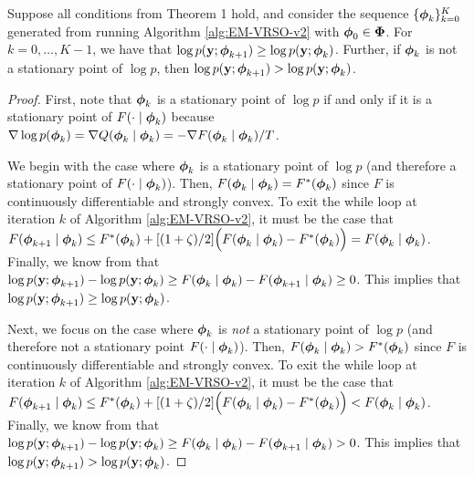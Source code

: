 \begin{lemma}
    Suppose all conditions from Theorem 1 hold, and consider the sequence $\{\boldsymbol{\phi}_k\}_{k=0}^{K}$ generated from running Algorithm \ref{alg:EM-VRSO-v2} with $\boldsymbol{\phi}_0 \in \boldsymbol{\Phi}$. For $k = 0,\ldots,K-1$, we have that $\log p(\mathbf{y};\boldsymbol{\phi}_{k+1}) \geq \log p(\mathbf{y};\boldsymbol{\phi}_k)$. Further, if $\boldsymbol{\phi}_k$ is not a stationary point of $\log p$, then $\log p(\mathbf{y};\boldsymbol{\phi}_{k+1}) > \log p(\mathbf{y};\boldsymbol{\phi}_k)$.
\end{lemma}

\begin{proof}

First, note that $\boldsymbol{\phi}_k$ is a stationary point of $\log p$ if and only if it is a stationary point of $F(\cdot \mid \boldsymbol{\phi}_k)$ because $\nabla \log p(\boldsymbol{\phi}_k) = \nabla Q(\boldsymbol{\phi}_k \mid \boldsymbol{\phi}_k) = -\nabla F(\boldsymbol{\phi}_k \mid \boldsymbol{\phi}_k) / T$.

We begin with the case where $\boldsymbol{\phi}_k$ is a stationary point of $\log p$ (and therefore a stationary point of $F(\cdot \mid \boldsymbol{\phi}_k)$). Then, $F(\boldsymbol{\phi}_k \mid \boldsymbol{\phi}_k) = F^{*}(\boldsymbol{\phi}_{k})$ since $F$ is continuously differentiable and strongly convex. To exit the while loop at iteration $k$ of Algorithm \ref{alg:EM-VRSO-v2}, it must be the case that $F(\boldsymbol{\phi}_{k+1} \mid \boldsymbol{\phi}_{k}) \leq F^*(\boldsymbol{\phi}_{k}) + [(1+\zeta)/2] \Big(F(\boldsymbol{\phi}_{k} \mid \boldsymbol{\phi}_{k}) - F^*(\boldsymbol{\phi}_{k}) \Big) = F(\boldsymbol{\phi}_k \mid \boldsymbol{\phi}_k)$. Finally, we know from \citet{Dempster:1977} that $\log p(\mathbf{y} ; \boldsymbol{\phi}_{k+1}) - \log p(\mathbf{y} ; \boldsymbol{\phi}_{k}) \geq F(\boldsymbol{\phi}_{k} \mid \boldsymbol{\phi}_{k}) - F(\boldsymbol{\phi}_{k+1} \mid \boldsymbol{\phi}_{k}) \geq 0$. This implies that $\log p(\mathbf{y} ; \boldsymbol{\phi}_{k+1}) \geq \log p(\mathbf{y} ; \boldsymbol{\phi}_{k})$.

Next, we focus on the case where $\boldsymbol{\phi}_k$ is \textit{not} a stationary point of $\log p$ (and therefore not a stationary point $F(\cdot \mid \boldsymbol{\phi}_k)$). Then, $F(\boldsymbol{\phi}_k \mid \boldsymbol{\phi}_k) > F^{*}(\boldsymbol{\phi}_{k})$ since $F$ is continuously differentiable and strongly convex. To exit the while loop at iteration $k$ of Algorithm \ref{alg:EM-VRSO-v2}, it must be the case that $F(\boldsymbol{\phi}_{k+1} \mid \boldsymbol{\phi}_{k}) \leq F^*(\boldsymbol{\phi}_{k}) + [(1+\zeta)/2] \Big(F(\boldsymbol{\phi}_{k} \mid \boldsymbol{\phi}_{k}) - F^*(\boldsymbol{\phi}_{k}) \Big) < F(\boldsymbol{\phi}_k \mid \boldsymbol{\phi}_k)$. Finally, we know from \citet{Dempster:1977} that $\log p(\mathbf{y} ; \boldsymbol{\phi}_{k+1}) - \log p(\mathbf{y} ; \boldsymbol{\phi}_{k}) \geq F(\boldsymbol{\phi}_{k} \mid \boldsymbol{\phi}_{k}) - F(\boldsymbol{\phi}_{k+1} \mid \boldsymbol{\phi}_{k}) > 0$. This implies that $\log p(\mathbf{y} ; \boldsymbol{\phi}_{k+1}) > \log p(\mathbf{y} ; \boldsymbol{\phi}_{k})$.
\end{proof}

